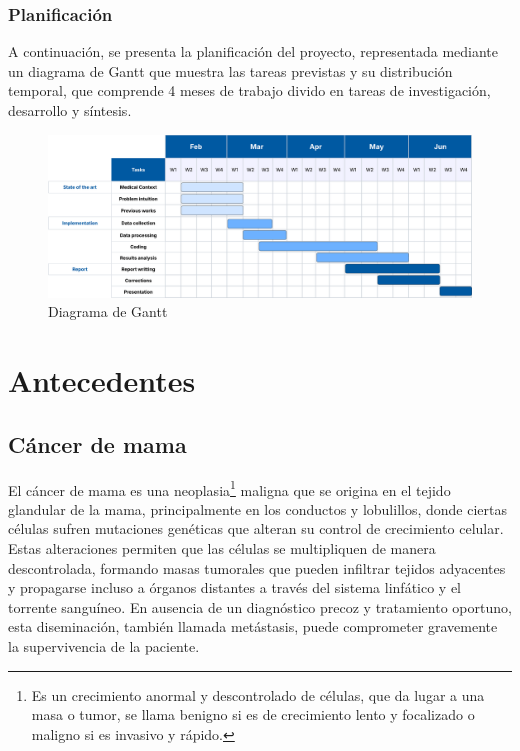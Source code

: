 \documentclass[a4paper,10pt]{book}
\begin{document}
\subsection{Planificación}

A continuación, se presenta la planificación del proyecto, representada mediante un diagrama de Gantt que muestra las tareas previstas y su distribución temporal, que comprende 4 meses de trabajo divido en tareas de investigación, desarrollo y síntesis.

\begin{figure}[h!]
	\centering
	\includegraphics[width=1\linewidth]{reports//assets/RoadmapV3.png}
	\caption{Diagrama de Gantt}
	\label{fig:roadmap}
\end{figure}




\chapter{Antecedentes}

\section{Cáncer de mama}

El cáncer de mama es una neoplasia\footnote{Es un crecimiento anormal y descontrolado de células, que da lugar a una masa o tumor, se llama benigno si es de crecimiento lento y focalizado o maligno si es invasivo y rápido.} maligna que se origina en el tejido glandular de la mama, principalmente en los conductos y lobulillos, donde ciertas células sufren mutaciones genéticas que alteran su control de crecimiento celular. Estas alteraciones permiten que las células se multipliquen de manera descontrolada, formando masas tumorales que pueden infiltrar tejidos adyacentes y propagarse incluso a órganos distantes a través del sistema linfático y el torrente sanguíneo. En ausencia de un diagnóstico precoz y tratamiento oportuno, esta diseminación, también llamada metástasis, puede comprometer gravemente la supervivencia de la paciente.
\end{document}
